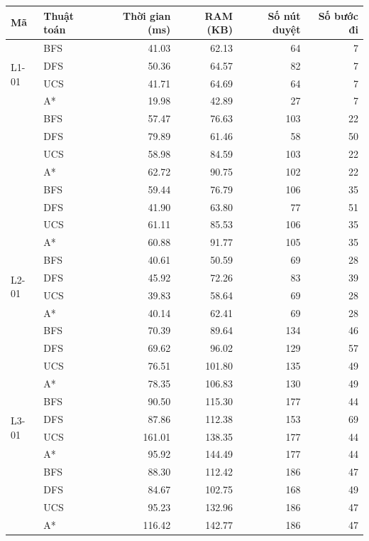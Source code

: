 \begin{table}[H]
\begin{tabular}{@{}l l r r r r@{}}
\toprule
\textbf{Mã} & \textbf{Thuật toán} & \textbf{Thời gian (ms)} & \textbf{RAM (KB)}
  & \textbf{Số nút duyệt} & \textbf{Số bước đi} \\
\midrule
\multirow{4}{*}{L1-01} & BFS & 41.03 & 62.13 & 64 & 7 \\
 & DFS & 50.36 & 64.57 & 82 & 7 \\
 & UCS & 41.71 & 64.69 & 64 & 7 \\
 & A* & 19.98 & 42.89 & 27 & 7 \\
\addlinespace[3pt]
\multirow{4}{*}{L1-02} & BFS & 57.47 & 76.63 & 103 & 22 \\
 & DFS & 79.89 & 61.46 & 58 & 50 \\
 & UCS & 58.98 & 84.59 & 103 & 22 \\
 & A* & 62.72 & 90.75 & 102 & 22 \\
\addlinespace[3pt]
\multirow{4}{*}{L1-03} & BFS & 59.44 & 76.79 & 106 & 35 \\
 & DFS & 41.90 & 63.80 & 77 & 51 \\
 & UCS & 61.11 & 85.53 & 106 & 35 \\
 & A* & 60.88 & 91.77 & 105 & 35 \\
\midrule
\multirow{4}{*}{L2-01} & BFS & 40.61 & 50.59 & 69 & 28 \\
 & DFS & 45.92 & 72.26 & 83 & 39 \\
 & UCS & 39.83 & 58.64 & 69 & 28 \\
 & A* & 40.14 & 62.41 & 69 & 28 \\
\addlinespace[3pt]
\multirow{4}{*}{L2-02} & BFS & 70.39 & 89.64 & 134 & 46 \\
 & DFS & 69.62 & 96.02 & 129 & 57 \\
 & UCS & 76.51 & 101.80 & 135 & 49 \\
 & A* & 78.35 & 106.83 & 130 & 49 \\
\midrule
\multirow{4}{*}{L3-01} & BFS & 90.50 & 115.30 & 177 & 44 \\
 & DFS & 87.86 & 112.38 & 153 & 69 \\
 & UCS & 161.01 & 138.35 & 177 & 44 \\
 & A* & 95.92 & 144.49 & 177 & 44 \\
\addlinespace[3pt]
\multirow{4}{*}{L3-02} & BFS & 88.30 & 112.42 & 186 & 47 \\
 & DFS & 84.67 & 102.75 & 168 & 49 \\
 & UCS & 95.23 & 132.96 & 186 & 47 \\
 & A* & 116.42 & 142.77 & 186 & 47 \\

\end{tabular}
\end{table}
